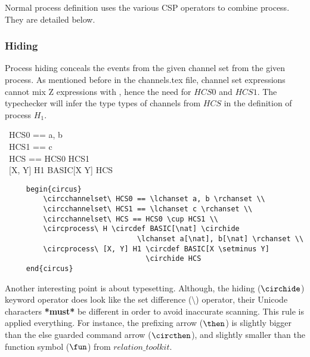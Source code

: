 \documentclass{article}
\begin{document}
Normal process definition uses the various CSP operators to combine process.
They are detailed below.

\subsubsection{Hiding}

Process hiding conceals the events from the given channel set from the given process.
As mentioned before in the \textsf{channels.tex} file, channel set expressions cannot
mix Z expressions with , hence the need for $HCS0$ and $HCS1$.
The typechecker will infer the type types of channels from $HCS$ in the definition of process $H_1$.
%
\begin{circus}
    \circchannelset\ HCS0 == \lchanset a, b \rchanset \\ %
    \circchannelset\ HCS1 == \lchanset c \rchanset \\
    \circchannelset\ HCS == HCS0 \cup HCS1 \\
    \circprocess\ [X, Y] H1 \circdef BASIC[X \setminus Y] \circhide HCS
\end{circus}
%
\begin{verbatim}
     begin{circus}
         \circchannelset\ HCS0 == \lchanset a, b \rchanset \\
         \circchannelset\ HCS1 == \lchanset c \rchanset \\
         \circchannelset\ HCS == HCS0 \cup HCS1 \\
         \circprocess\ H \circdef BASIC[\nat] \circhide
                               \lchanset a[\nat], b[\nat] \rchanset \\
         \circprocess\ [X, Y] H1 \circdef BASIC[X \setminus Y]
                                 \circhide HCS
     end{circus}
\end{verbatim}
%
Another interesting point is about typesetting. Although, the hiding ($\circhide$) keyword operator
does look like the set difference ($\setminus$) operator, their Unicode characters \textbf{*must*}
be different in order to avoid inaccurate scanning. This rule is applied everything. For instance,
the prefixing arrow ($\then$) is slightly bigger than the else guarded command arrow ($\circthen$),
and slightly smaller than the function symbol ($\fun$) from $relation\_toolkit$.
\end{document}
